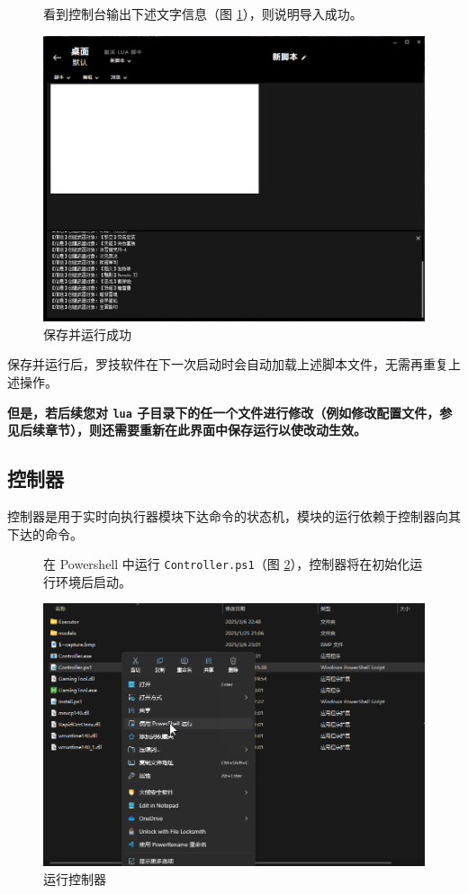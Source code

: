 \begin{figure}[H]
    \Centering
    \parbox[l]{\textwidth}{看到控制台输出下述文字信息（图 \ref{ch0fig-success}），则说明导入成功。}
    \includegraphics[width=\textwidth]{assets/intro/success.png}
    \caption{保存并运行成功}
    \label{ch0fig-success}
\end{figure}

保存并运行后，罗技软件在下一次启动时会自动加载上述脚本文件，无需再重复上述操作。

\textbf{\color{red}但是，若后续您对 \lstinline{lua} 子目录下的任一个文件进行修改（例如修改配置文件，参见后续章节），则还需要重新在此界面中保存运行以使改动生效。}

\subsection{控制器}

控制器是用于实时向执行器模块下达命令的状态机，模块的运行依赖于控制器向其下达的命令。

\begin{figure}[H]
    \Centering
    \parbox[l]{\textwidth}{在 Powershell 中运行 \lstinline{Controller.ps1}（图 \ref{ch0fig-run-controller}），控制器将在初始化运行环境后启动。}
    \includegraphics[width=\textwidth]{assets/intro/run_controller.png}
    \caption{运行控制器}
    \label{ch0fig-run-controller}
\end{figure}

